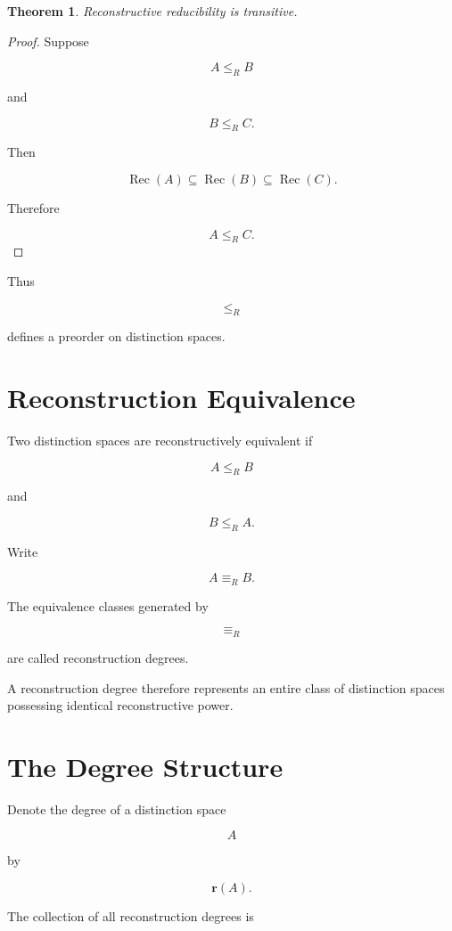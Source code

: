 \documentclass[12pt,oneside]{book}
\theoremstyle{plain} \newtheorem{theorem}{Theorem}[chapter] \newtheorem{lemma}[theorem]{Lemma} \newtheorem{proposition}[theorem]{Proposition} \newtheorem{corollary}[theorem]{Corollary}
\theoremstyle{definition} \newtheorem{definition}[theorem]{Definition} \newtheorem{axiom}[theorem]{Axiom} \newtheorem{construction}[theorem]{Construction}
\theoremstyle{remark} \newtheorem{remark}[theorem]{Remark} \newtheorem{example}[theorem]{Example}
\begin{document}
\begin{theorem}

Reconstructive reducibility is transitive.

\end{theorem}

\begin{proof}

Suppose

\[
A
\le_R
B
\]

and

\[
B
\le_R
C.
\]

Then

\[
\operatorname{Rec}(A)
\subseteq
\operatorname{Rec}(B)
\subseteq
\operatorname{Rec}(C).
\]

Therefore

\[
A
\le_R
C.
\]

\end{proof}

Thus

\[
\le_R
\]

defines a preorder on distinction spaces.

\section{Reconstruction Equivalence}

Two distinction spaces are reconstructively equivalent if

\[
A
\le_R
B
\]

and

\[
B
\le_R
A.
\]

Write

\[
A
\equiv_R
B.
\]

The equivalence classes generated by

\[
\equiv_R
\]

are called reconstruction degrees.

A reconstruction degree therefore represents an entire class of distinction spaces possessing identical reconstructive power.

\section{The Degree Structure}

Denote the degree of a distinction space

\[
A
\]

by

\[
\mathbf r(A).
\]

The collection of all reconstruction degrees is
\end{document}
